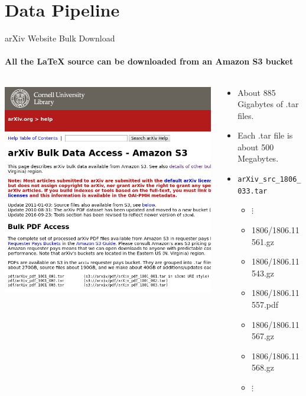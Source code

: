 \documentclass{beamer}
\begin{document}
\section{Data Pipeline}
\begin{frame}{arXiv Website Bulk Download}
    \framesubtitle{All the \LaTeX{} source can be downloaded from an Amazon S3 bucket}
    \begin{columns}[T]
        \begin{column}{0.4\textwidth}
    \includegraphics[width=\textwidth]{bulk_download.png} 
        \end{column}
        \begin{column}{0.6\textwidth}
            \begin{itemize}
                \item About 885 Gigabytes of .tar files.
                \item Each .tar file is about 500 Megabytes.
                \item \texttt{arXiv\_src\_1806\_033.tar}
                    \begin{itemize}
\item \hspace{4em}      $\vdots$
\item 1806/1806.11561.gz
\item 1806/1806.11543.gz
\item 1806/1806.11557.pdf
\item 1806/1806.11567.gz
\item 1806/1806.11568.gz
\item \hspace{4em}      $\vdots$
\end{itemize}


            \end{itemize}
        \end{column}
    \end{columns}
\end{frame}
\end{document}
